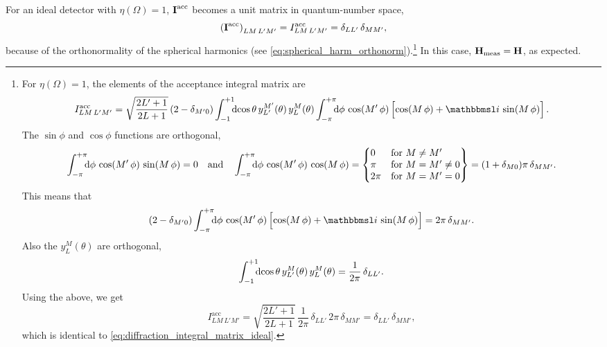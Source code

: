 For an ideal detector with $\eta(\Omega) = 1$, $\bm{\mathrm{I}}^\text{acc}$
becomes a unit matrix in quantum-number space, \ie
\begin{equation}
  \label{eq:diffraction_integral_matrix_ideal}
  \rBrk{\mat{I}^\text{acc}}_{L M\, L' M'}
  = I^\text{acc}_{L M\, L' M'}
  = \delta_{L L'}\, \delta_{M M'},
\end{equation}
because of the orthonormality of the spherical harmonics (see
\cref{eq:spherical_harm_orthonorm}).\footnote{%
  \label{fn:diffraction_integral_matrix_perfect_det}%
  For $\eta(\Omega) = 1$, the elements of the acceptance integral
  matrix are
  \begin{equation}
    I^\text{acc}_{L M\, L' M'}
    = \sqrt{\frac{2 L' + 1}{2 L + 1}}\, (2 - \delta_{M' 0})
    \int_{-1}^{+1}\!\!\! \dif{\cos\theta}\, y_{L'}^{M'}(\theta)\, y_L^M(\theta)
    \int_{-\pi}^{+\pi}\!\!\! \dif{\phi}\, \cos(M'\, \phi) \sBrk[2]{\cos(M\, \phi) + \imag\, \sin(M\, \phi)}.
  \end{equation}
  The $\sin \phi$ and $\cos \phi$ functions are orthogonal, \ie
  \begin{equation}
    \label{eq:sin_cos_orthogonality}
    \int_{-\pi}^{+\pi}\!\!\! \dif{\phi}\, \cos(M'\, \phi)\, \sin(M\, \phi)
    = 0
    \quad\text{and}\quad
    \int_{-\pi}^{+\pi}\!\!\! \dif{\phi}\, \cos(M'\, \phi)\, \cos(M\, \phi)
    = \begin{Bmatrix*}[l]
      0    & \text{for $M \neq M'$} \\
      \pi  & \text{for $M = M' \neq 0$} \\
      2\pi & \text{for $M = M' = 0$}
    \end{Bmatrix*}
    = (1 + \delta_{M 0}) \pi\, \delta_{M M'}.
  \end{equation}
  This means that
  \begin{equation}
    (2 - \delta_{M' 0})
    \int_{-\pi}^{+\pi}\!\!\! \dif{\phi}\, \cos(M'\, \phi) \sBrk[2]{\cos(M\, \phi) + \imag\, \sin(M\, \phi)}
    = 2 \pi\, \delta_{M M'}.
  \end{equation}
  Also the $y_L^M(\theta)$ are orthogonal, \ie
  \begin{equation}
    \label{eq:small_y_orthogonality}
    \int_{-1}^{+1}\!\!\! \dif{\cos\theta}\, y_{L'}^{M}(\theta)\, y_L^M(\theta)
    = \frac{1}{2 \pi}\, \delta_{L L'}.
  \end{equation}
  Using the above, we get
  \begin{equation}
    I^\text{acc}_{L M\, L' M'}
    = \sqrt{\frac{2 L' + 1}{2 L + 1}}\,
    \frac{1}{2 \pi}\, \delta_{L L'}\,
    2 \pi\, \delta_{M M'}
    = \delta_{L L'}\, \delta_{M M'},
  \end{equation}
  which is identical to \cref{eq:diffraction_integral_matrix_ideal}.
}
In this case, $\bm{\mathrm{H}}_\text{meas} = \bm{\mathrm{H}}$, as expected.

